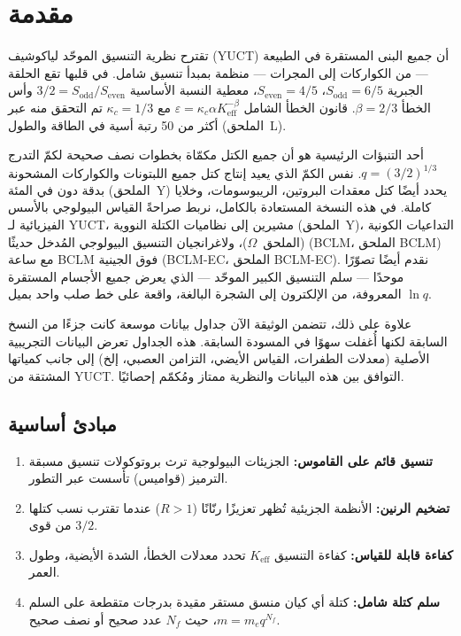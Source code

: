 \documentclass[11pt,a4paper]{article}
\begin{document}
	\tableofcontents
	\newpage
	
	\section{مقدمة}
	
	تقترح نظرية التنسيق الموحّد لياكوشيف (YUCT) أن جميع البنى المستقرة في الطبيعة — من الكواركات إلى المجرات — منظمة بمبدأ تنسيق شامل. في قلبها تقع الحلقة الجبرية \(S_{\mathrm{odd}} = 6/5\)، \(S_{\mathrm{even}} = 4/5\)، معطية النسبة الأساسية \(3/2 = S_{\mathrm{odd}}/S_{\mathrm{even}}\) وأس الخطأ \(\beta = 2/3\). قانون الخطأ الشامل \(\varepsilon = \kappa_c \alpha K_{\mathrm{eff}}^{-\beta}\) مع \(\kappa_c = 1/3\) تم التحقق منه عبر أكثر من 50 رتبة أسية في الطاقة والطول (الملحق~L).
	
	أحد التنبؤات الرئيسية هو أن جميع الكتل مكمّاة بخطوات نصف صحيحة لكمّ التدرج \(q = (3/2)^{1/3}\). نفس الكمّ الذي يعيد إنتاج كتل جميع اللبتونات والكواركات المشحونة بدقة دون في المئة (الملحق~Y) يحدد أيضًا كتل معقدات البروتين، الريبوسومات، وخلايا كاملة. في هذه النسخة المستعادة بالكامل، نربط صراحةً القياس البيولوجي بالأسس الفيزيائية لـ YUCT، مشيرين إلى نظاميات الكتلة النووية (الملحق~Y)، التداعيات الكونية (الملحق~\(\Omega\))، ولاغرانجيان التنسيق البيولوجي المُدخل حديثًا (BCLM، الملحق BCLM) مع ساعة BCLM فوق الجينية (BCLM-EC، الملحق BCLM-EC). نقدم أيضًا تصوّرًا موحدًا — سلم التنسيق الكبير الموحّد — الذي يعرض جميع الأجسام المستقرة المعروفة، من الإلكترون إلى الشجرة البالغة، واقعة على خط صلب واحد بميل \(\ln q\).
	
	علاوة على ذلك، تتضمن الوثيقة الآن جداول بيانات موسعة كانت جزءًا من النسخ السابقة لكنها أُغفلت سهوًا في المسودة السابقة. هذه الجداول تعرض البيانات التجريبية الأصلية (معدلات الطفرات، القياس الأيضي، التزامن العصبي، إلخ) إلى جانب كمياتها المشتقة من YUCT. التوافق بين هذه البيانات والنظرية ممتاز ومُكمّم إحصائيًا.
	
	\subsection{مبادئ أساسية}
	
	\begin{enumerate}
		\item \textbf{تنسيق قائم على القاموس:} الجزيئات البيولوجية ترث بروتوكولات تنسيق مسبقة الترميز (قواميس) تأسست عبر التطور.
		\item \textbf{تضخيم الرنين:} الأنظمة الجزيئية تُظهر تعزيزًا رنّانًا (\(R > 1\)) عندما تقترب نسب كتلها من قوى \(3/2\).
		\item \textbf{كفاءة قابلة للقياس:} كفاءة التنسيق \(K_{\mathrm{eff}}\) تحدد معدلات الخطأ، الشدة الأيضية، وطول العمر.
		\item \textbf{سلم كتلة شامل:} كتلة أي كيان منسق مستقر مقيدة بدرجات متقطعة على السلم \(m = m_e q^{N_f}\)، حيث \(N_f\) عدد صحيح أو نصف صحيح.
	\end{enumerate}
	
\end{document}
